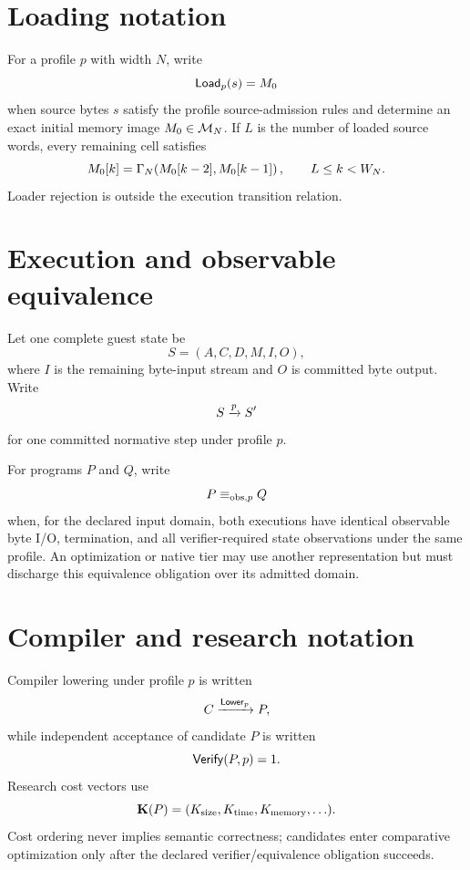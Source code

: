 \documentclass{article}
\begin{document}
\section{Loading notation}

For a profile $p$ with width $N$, write
\begin{equation}
  \mathsf{Load}_p(s)=M_0
  \label{eq:profile-load}
\end{equation}
when source bytes $s$ satisfy the profile source-admission rules and determine
an
exact initial memory image $M_0\in\mathcal{M}_{N}$. If $L$ is the number of
loaded source words, every remaining cell satisfies
\begin{equation}
  M_0[k]=\Gamma_{N}\!\left(M_0[k-2],M_0[k-1]\right),
  \qquad L\leq k < W_N.
  \label{eq:profile-load-recurrence}
\end{equation}
Loader rejection is outside the execution transition relation.

\section{Execution and observable equivalence}

Let one complete guest state be
\[
  S=(A,C,D,M,I,O),
\]
where $I$ is the remaining byte-input stream and $O$ is committed byte output.
Write
\begin{equation}
  S \xrightarrow{p} S'
  \label{eq:profile-transition}
\end{equation}
for one committed normative step under profile $p$.

For programs $P$ and $Q$, write
\begin{equation}
  P\equiv_{\mathrm{obs},p}Q
  \label{eq:profile-observable-equivalence}
\end{equation}
when, for the declared input domain, both executions have identical observable
byte I/O, termination, and all verifier-required state observations under the
same profile. An optimization or native tier may use another representation but
must discharge this equivalence obligation over its admitted domain.

\section{Compiler and research notation}

Compiler lowering under profile $p$ is written
\[
  C \xrightarrow{\mathsf{Lower}_p} P,
\]
while independent acceptance of candidate $P$ is written
\[
  \mathsf{Verify}(P,p)=1.
\]
Research cost vectors use
\[
  \mathbf{K}\!\left(P\right)
    = (K_{\mathrm{size}},K_{\mathrm{time}},K_{\mathrm{memory}},\ldots).
\]
Cost ordering never implies semantic correctness; candidates enter comparative
optimization only after the declared verifier/equivalence obligation succeeds.
\end{document}
